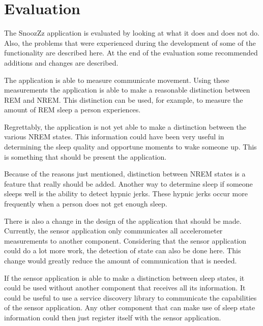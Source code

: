 \chapter{Evaluation} %
\label{cha:evaluation}
The SnoozZz application is evaluated by looking at what it does and does not do. Also, the problems that were experienced during the development of some of the functionality are described here. At the end of the evaluation some recommended additions and changes are described.

The application is able to measure communicate movement. Using these measurements the application is able to make a reasonable distinction between REM and NREM. This distinction can be used, for example, to measure the amount of REM sleep a person experiences.

Regrettably, the application is not yet able to make a distinction between the various NREM states. This information could have been very useful in determining the sleep quality and opportune moments to wake someone up. This is something that should be present the application.

Because of the reasons just mentioned, distinction between NREM states is a feature that really should be added. Another way to determine sleep if someone sleeps well is the ability to detect hypnic jerks. These hypnic jerks occur more frequently when a person does not get enough sleep.

There is also a change in the design of the application that should be made. Currently, the sensor application only communicates all accelerometer measurements to another component. Considering that the sensor application could do a lot more work, the detection of state can also be done here. This change would greatly reduce the amount of communication that is needed.

If the sensor application is able to make a distinction between sleep states, it could be used without another component that receives all its information. It could be useful to use a service discovery library to communicate the capabilities of the sensor application. Any other component that can make use of sleep state information could then just register itself with the sensor application.
